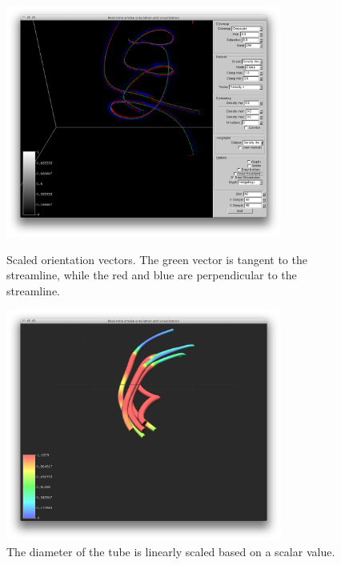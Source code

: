 \begin{figure}[htbp]
\centering
\begin{minipage}[t]{0.48\textwidth}
        \includegraphics[height=3in]{figures/streamtubes/uvp.png}
\caption{Scaled orientation vectors. The green vector is tangent to the streamline, while the red and blue are perpendicular to the streamline.}
\label{fig:}
\end{minipage}\hspace{.04\textwidth}%
\begin{minipage}[t]{0.48\textwidth}
               \includegraphics[height=3in]{figures/streamtubes/11thickTubes.png} 
    \caption{The diameter of the tube is linearly scaled based on a scalar value.}
    \label{fig:}
\end{minipage}
\end{figure}



